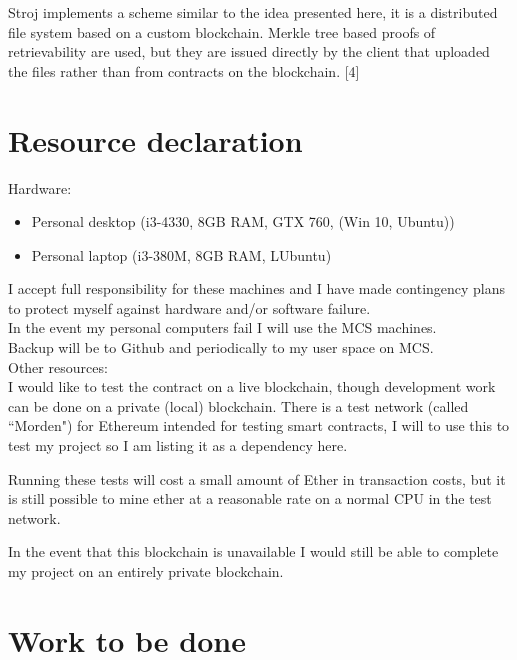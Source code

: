\documentclass[oneside]{article}
\begin{document}
Stroj implements a scheme similar to the idea presented here, it is a distributed file system based on a custom blockchain. Merkle tree based proofs of retrievability are used, but they are issued directly by the client that uploaded the files rather than from contracts on the blockchain. [4]

\section{Resource declaration}

Hardware:

\begin{itemize}
\item Personal desktop (i3-4330, 8GB RAM, GTX 760, (Win 10, Ubuntu))
\item Personal laptop (i3-380M, 8GB RAM, LUbuntu)
\end{itemize}
I accept full responsibility for these machines and I have made contingency plans to protect myself against hardware and/or software failure.\\
In the event my personal computers fail I will use the MCS machines.\\
Backup will be to Github and periodically to my user space on MCS.\\

Other resources:\\

I would like to test the contract on a live blockchain, though development work can be done on a private (local) blockchain.
There is a test network (called ``Morden") for Ethereum intended for testing smart contracts, I will to use this to test my project so I am listing it as a dependency here.

Running these tests will cost a small amount of Ether in transaction costs, but it is still possible to mine ether at a reasonable rate on a normal CPU in the test network.

In the event that this blockchain is unavailable I would still be able to complete my project on an entirely private blockchain.

\section{Work to be done}
\end{document}
